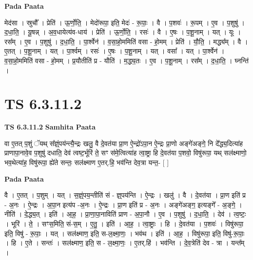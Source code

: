 \documentclass[17pt]{extarticle}
\begin{document}
\textbf{Pada Paata} \newline

मेद॑सा । स्रुचौ᳚ । प्रेति॑ । ऊ॒र्णो॒ति॒ । मेदो॑रूपा॒ इति॒ मेदः॑ - रू॒पाः॒ । वै । प॒शवः॑ । रू॒पम् । ए॒व । प॒शुषु॑ । द॒धा॒ति॒ । यू॒षन्न् । अ॒व॒धायेत्य॑व-धाय॑ । प्रेति॑ । ऊ॒र्णो॒ति॒ । रसः॑ । वै । ए॒षः । प॒शू॒नाम् । यत् । यूः । रस᳚म् । ए॒व । प॒शुषु॑ । द॒धा॒ति॒ । पा॒र्श्वेन॑ । व॒सा॒हो॒ममिति॑ वसा - हो॒मम् । प्रेति॑ । यौ॒ति॒ । मद्ध्य᳚म् । वै । ए॒तत् । प॒शू॒नाम् । यत् । पा॒र्श्वम् । रसः॑ । ए॒षः । प॒शू॒नाम् । यत् । वसा᳚ । यत् । पा॒र्श्वेन॑ । व॒सा॒हो॒ममिति॑ वसा - हो॒मम् । प्र॒यौतीति॑ प्र - यौति॑ । म॒द्ध्य॒तः । ए॒व । प॒शू॒नाम् । रस᳚म् । द॒धा॒ति॒ । घ्नन्ति॑ ।  \newline





\section{ TS 6.3.11.2 }

\textbf{TS 6.3.11.2 } \newline
\textbf{Samhita Paata} \newline

वा ए॒तत् प॒शुं ॅयथ् स᳚ज्ञ्ं॒पय॑न्त्यै॒न्द्रः खलु॒ वै दे॒वत॑या प्रा॒ण ऐ॒न्द्रो॑ऽपा॒न ऐ॒न्द्रः प्रा॒णो अङ्गे॑अङ्गे॒ नि दे᳚द्ध्य॒दित्या॑ह प्राणापा॒नावे॒व प॒शुषु॑ दधाति॒ देव॑ त्वष्ट॒र्भूरि॑ ते॒ सꣳ स॑मे॒त्वित्या॑ह त्वा॒ष्ट्रा हि दे॒वत॑या प॒शवो॒ विषु॑रूपा॒ यथ् सल॑क्ष्माणो॒ भव॒थेत्या॑ह॒ विषु॑रूपा॒ ह्ये॑ते सन्तः॒ सल॑क्ष्माण ए॒तर्.हि॒ भव॑न्ति देव॒त्रा यन्त॒- [  ] \newline

\textbf{Pada Paata} \newline

वै । ए॒तत् । प॒शुम् । यत् । स॒ज्ञ्ं॒पय॒न्तीति॑ सं - ज्ञ्॒पय॑न्ति । ऐ॒न्द्रः । खलु॑ । वै । दे॒वत॑या । प्रा॒ण इति॑ प्र - अ॒नः । ऐ॒न्द्रः । अ॒पा॒न इत्य॑प -अ॒नः । ऐ॒न्द्रः । प्रा॒ण इति॑ प्र - अ॒नः । अङ्गे॑अङ्ग॒ इत्यङ्गे᳚ - अ॒ङ्गे॒ । नीति॑ । दे॒द्ध्य॒त् । इति॑ । आ॒ह॒ । प्रा॒णा॒पा॒नाविति॑ प्राण - अ॒पा॒नौ । ए॒व । प॒शुषु॑ । द॒धा॒ति॒ । देव॑ । त्व॒ष्टः॒ । भूरि॑ । ते॒ । सꣳस॒मिति॒ सं-स॒म् । ए॒तु॒ । इति॑ । आ॒ह॒ । त्वा॒ष्ट्राः । हि । दे॒वत॑या । प॒शवः॑ । विषु॑रूपा॒ इति॒ विषु॑ - रू॒पाः॒ । यत् । सल॑क्ष्माण॒ इति॒ स-ल॒क्ष्मा॒णः॒ । भव॑थ । इति॑ । आ॒ह॒ । विषु॑रूपा॒ इति॒ विषु॑-रू॒पाः॒ । हि । ए॒ते । सन्तः॑ । सल॑क्ष्माण॒ इति॒ स - ल॒क्ष्मा॒णः॒ । ए॒तर्.हि॑ । भव॑न्ति । दे॒व॒त्रेति॑ देव - त्रा । यन्त᳚म् ।  \newline
\end{document}
